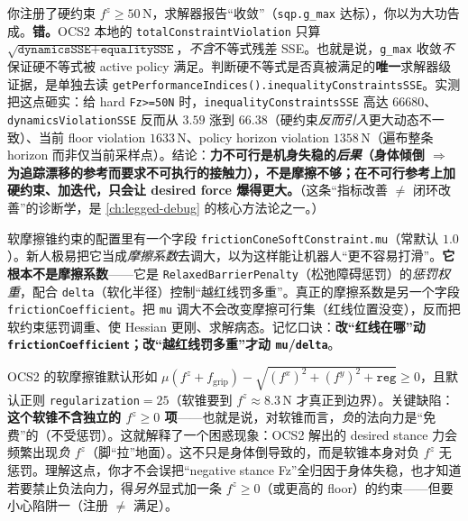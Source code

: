 \begin{pitfall}\label{pit:lb-register-ne-satisfy}
你注册了硬约束 $f^z\ge 50\,\mathrm{N}$，求解器报告“收敛”（\texttt{sqp.g\_max} 达标），你以为大功告成。\textbf{错。}OCS2 本地的 \texttt{totalConstraintViolation} 只算 $\sqrt{\texttt{dynamicsSSE}+\texttt{equalitySSE}}$，\emph{不含}不等式残差 SSE。也就是说，\texttt{g\_max} 收敛\emph{不}保证硬不等式被 active policy 满足。判断硬不等式是否真被满足的\textbf{唯一}求解器级证据，是单独去读 \texttt{getPerformanceIndices().\allowbreak inequalityConstraintsSSE}。实测把这点砸实：给 hard \texttt{Fz>=50N} 时，\texttt{inequalityConstraintsSSE} 高达 $66680$、\texttt{dynamicsViolationSSE} 反而从 $3.59$ 涨到 $66.38$（硬约束\emph{反而引入}更大动态不一致）、当前 floor violation $1633\,\mathrm{N}$、policy horizon violation $1358\,\mathrm{N}$（遍布整条 horizon 而非仅当前采样点）。结论：\textbf{力不可行是机身失稳的\emph{后果}（身体倾倒 $\Rightarrow$ 为追踪漂移的参考而要求不可执行的接触力），不是摩擦不够；在不可行参考上加硬约束、加迭代，只会让 desired force 爆得更大。}（这条“指标改善 $\ne$ 闭环改善”的诊断学，是 \cref{ch:legged-debug} 的核心方法论之一。）
\end{pitfall}

\begin{pitfall}\label{pit:lb-mu-naming}
软摩擦锥约束的配置里有一个字段 \texttt{frictionConeSoftConstraint.\allowbreak mu}（常默认 $1.0$）。新人极易把它当成\emph{摩擦系数}去调大，以为这样能让机器人“更不容易打滑”。\textbf{它根本不是摩擦系数}——它是 \texttt{RelaxedBarrierPenalty}（松弛障碍惩罚）的\emph{惩罚权重}，配合 \texttt{delta}（软化半径）控制“越红线罚多重”。真正的摩擦系数是另一个字段 \texttt{frictionCoefficient}。把 \texttt{mu} 调大不会改变摩擦可行集（红线位置没变），反而把软约束惩罚调重、使 Hessian 更刚、求解病态。记忆口诀：\textbf{改“红线在哪”动 \texttt{frictionCoefficient}；改“越红线罚多重”才动 \texttt{mu}/\allowbreak\texttt{delta}}。
\end{pitfall}

\begin{pitfall}\label{pit:lb-soft-cone-free}
OCS2 的软摩擦锥默认形如 $\mu(f^z+f_{\mathrm{grip}})-\sqrt{(f^x)^2+(f^y)^2+\texttt{reg}}\ge 0$，且默认正则 \texttt{regularization}$=25$（软锥要到 $f^z\approx 8.3\,\mathrm{N}$ 才真正到边界）。关键缺陷：\textbf{这个软锥不含独立的 $f^z\ge 0$ 项}——也就是说，对软锥而言，\emph{负}的法向力是“免费”的（不受惩罚）。这就解释了一个困惑现象：OCS2 解出的 desired stance 力会频繁出现\emph{负} $f^z$（脚“拉”地面）。这不只是身体倒导致的，而是软锥本身对负 $f^z$ 无惩罚。理解这点，你才不会误把“negative stance Fz”全归因于身体失稳，也才知道若要禁止负法向力，得\emph{另外}显式加一条 $f^z\ge 0$（或更高的 floor）的约束——但要小心陷阱一（注册 $\ne$ 满足）。
\end{pitfall}

